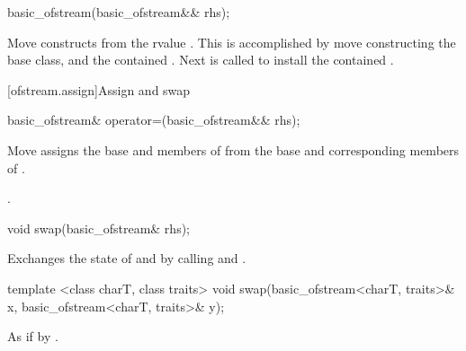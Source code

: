 %
\begin{itemdecl}
basic_ofstream(basic_ofstream&& rhs);
\end{itemdecl}

\begin{itemdescr}
\pnum
\effects Move constructs from the rvalue . This
is accomplished by move constructing the base class, and the contained
. Next
 is called to install
the contained .
\end{itemdescr}

[ofstream.assign]{Assign and swap}

%
%
\begin{itemdecl}
basic_ofstream& operator=(basic_ofstream&& rhs);
\end{itemdecl}

\begin{itemdescr}
\pnum
\effects Move assigns the base and members of  from the base and corresponding
members of .

\pnum
\returns {}.
\end{itemdescr}

%
%
\begin{itemdecl}
void swap(basic_ofstream& rhs);
\end{itemdecl}

\begin{itemdescr}
\pnum
\effects Exchanges the state of 
and  by calling
 and
.
\end{itemdescr}

%
%
\begin{itemdecl}
template <class charT, class traits>
  void swap(basic_ofstream<charT, traits>& x,
            basic_ofstream<charT, traits>& y);
\end{itemdecl}

\begin{itemdescr}
\pnum
\effects As if by .
\end{itemdescr}

